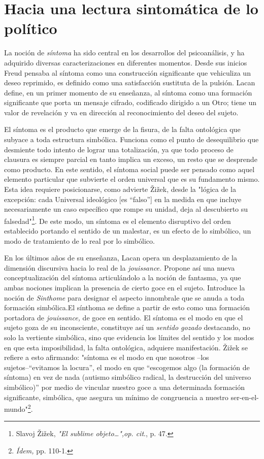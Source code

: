 \documentclass{book}
\begin{document}
\section{Hacia una lectura sintomática de lo político}

La noción de \emph{síntoma} ha sido central en los desarrollos del
psicoanálisis, y ha adquirido diversas caracterizaciones en diferentes
momentos. Desde sus inicios Freud pensaba al síntoma como una
construcción significante que vehiculiza un deseo reprimido, es definido
como una satisfacción sustituta de la pulsión. Lacan define, en un
primer momento de su enseñanza, al síntoma como una formación
significante que porta un mensaje cifrado, codificado dirigido a un
Otro; tiene un valor de revelación y va en dirección al reconocimiento
del deseo del sujeto.

El síntoma es el producto que emerge de la fisura, de la falta
ontológica que subyace a toda estructura simbólica. Funciona como el
punto de desequilibrio que desmiente todo intento de lograr una
totalización, ya que todo proceso de clausura es siempre parcial en
tanto implica un exceso, un resto que se desprende como producto. En
este sentido, el síntoma social puede ser pensado como aquel elemento
particular que subvierte el orden universal que es su fundamento mismo.
Esta idea requiere posicionarse, como advierte Žižek, desde la "lógica
de la excepción: cada Universal ideológico {[}es ``falso''{]} en la
medida en que incluye necesariamente un caso específico que rompe su
unidad, deja al descubierto su falsedad"\footnote{Slavoj Žižek,
  \emph{"El sublime objeto\ldots",op. cit}., p. 47.}. De este modo, un
síntoma es el elemento disruptivo del orden establecido portando el
sentido de un malestar, es un efecto de lo simbólico, un modo de
tratamiento de lo real por lo simbólico.

En los últimos años de su enseñanza, Lacan opera un desplazamiento de la
dimensión discursiva hacia lo real de la \emph{jouissance.} Propone así
una nueva conceptualización del síntoma articulándolo a la noción de
fantasma, ya que ambas nociones implican la presencia de cierto goce en
el sujeto. Introduce la noción de \emph{Sinthome} para designar el
aspecto innombrale que se anuda a toda formación simbólica.El sínthoma
se define a partir de esto como una formación portadora de
\emph{jouissance,} de goce en sentido. El síntoma es el modo en que el
sujeto goza de su inconsciente, constituye así un \emph{sentido gozado}
destacando, no solo la vertiente simbólica, sino que evidencia los
límites del sentido y los modos en que esta imposibilidad, la falta
ontológica, adquiere manifestación. Žižek se refiere a esto afirmando:
"síntoma es el modo en que nosotros --los sujetos--``evitamos la
locura'', el modo en que ``escogemos algo (la formación de síntoma) en
vez de nada (autismo simbólico radical, la destrucción del universo
simbólico)'' por medio de vincular nuestro goce a una determinada
formación significante, simbólica, que asegura un mínimo de congruencia
a nuestro ser-en-el-mundo"\footnote{\emph{Ídem,} pp. 110-1.}.
\end{document}
